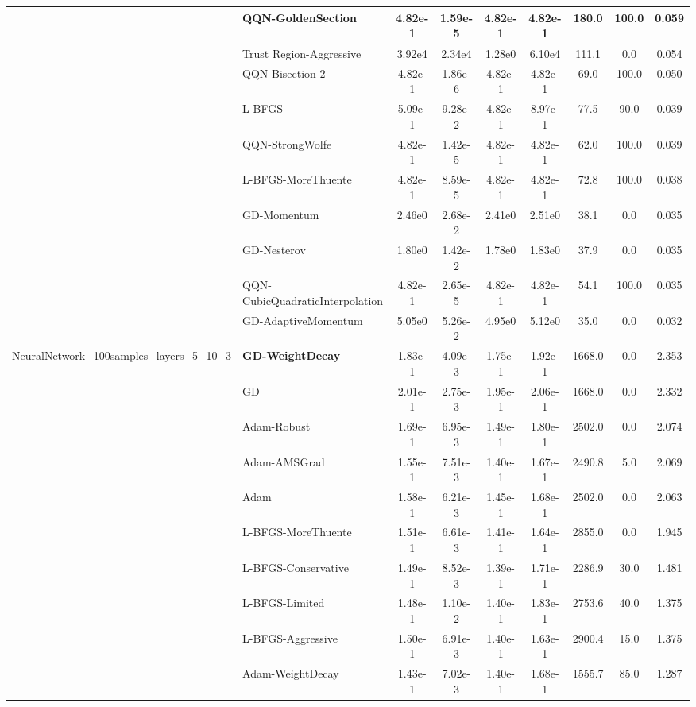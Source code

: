 \documentclass[10pt]{article}
\begin{document}
\begin{longtable}{|l|l|c|c|c|c|c|c|c|}
\hline
 & QQN-GoldenSection & 4.82e-1 & 1.59e-5 & 4.82e-1 & 4.82e-1 & 180.0 & 100.0 & 0.059 \\
\hline
 & Trust Region-Aggressive & 3.92e4 & 2.34e4 & 1.28e0 & 6.10e4 & 111.1 & 0.0 & 0.054 \\
\hline
 & QQN-Bisection-2 & 4.82e-1 & 1.86e-6 & 4.82e-1 & 4.82e-1 & 69.0 & 100.0 & 0.050 \\
\hline
 & L-BFGS & 5.09e-1 & 9.28e-2 & 4.82e-1 & 8.97e-1 & 77.5 & 90.0 & 0.039 \\
\hline
 & QQN-StrongWolfe & 4.82e-1 & 1.42e-5 & 4.82e-1 & 4.82e-1 & 62.0 & 100.0 & 0.039 \\
\hline
 & L-BFGS-MoreThuente & 4.82e-1 & 8.59e-5 & 4.82e-1 & 4.82e-1 & 72.8 & 100.0 & 0.038 \\
\hline
 & GD-Momentum & 2.46e0 & 2.68e-2 & 2.41e0 & 2.51e0 & 38.1 & 0.0 & 0.035 \\
\hline
 & GD-Nesterov & 1.80e0 & 1.42e-2 & 1.78e0 & 1.83e0 & 37.9 & 0.0 & 0.035 \\
\hline
 & QQN-CubicQuadraticInterpolation & 4.82e-1 & 2.65e-5 & 4.82e-1 & 4.82e-1 & 54.1 & 100.0 & 0.035 \\
\hline
 & GD-AdaptiveMomentum & 5.05e0 & 5.26e-2 & 4.95e0 & 5.12e0 & 35.0 & 0.0 & 0.032 \\
NeuralNetwork\_100samples\_layers\_5\_10\_3 & \textbf{GD-WeightDecay} & 1.83e-1 & 4.09e-3 & 1.75e-1 & 1.92e-1 & 1668.0 & 0.0 & 2.353 \\
\hline
 & GD & 2.01e-1 & 2.75e-3 & 1.95e-1 & 2.06e-1 & 1668.0 & 0.0 & 2.332 \\
\hline
 & Adam-Robust & 1.69e-1 & 6.95e-3 & 1.49e-1 & 1.80e-1 & 2502.0 & 0.0 & 2.074 \\
\hline
 & Adam-AMSGrad & 1.55e-1 & 7.51e-3 & 1.40e-1 & 1.67e-1 & 2490.8 & 5.0 & 2.069 \\
\hline
 & Adam & 1.58e-1 & 6.21e-3 & 1.45e-1 & 1.68e-1 & 2502.0 & 0.0 & 2.063 \\
\hline
 & L-BFGS-MoreThuente & 1.51e-1 & 6.61e-3 & 1.41e-1 & 1.64e-1 & 2855.0 & 0.0 & 1.945 \\
\hline
 & L-BFGS-Conservative & 1.49e-1 & 8.52e-3 & 1.39e-1 & 1.71e-1 & 2286.9 & 30.0 & 1.481 \\
\hline
 & L-BFGS-Limited & 1.48e-1 & 1.10e-2 & 1.40e-1 & 1.83e-1 & 2753.6 & 40.0 & 1.375 \\
\hline
 & L-BFGS-Aggressive & 1.50e-1 & 6.91e-3 & 1.40e-1 & 1.63e-1 & 2900.4 & 15.0 & 1.375 \\
\hline
 & Adam-WeightDecay & 1.43e-1 & 7.02e-3 & 1.40e-1 & 1.68e-1 & 1555.7 & 85.0 & 1.287 \\

\end{longtable}
\end{document}
